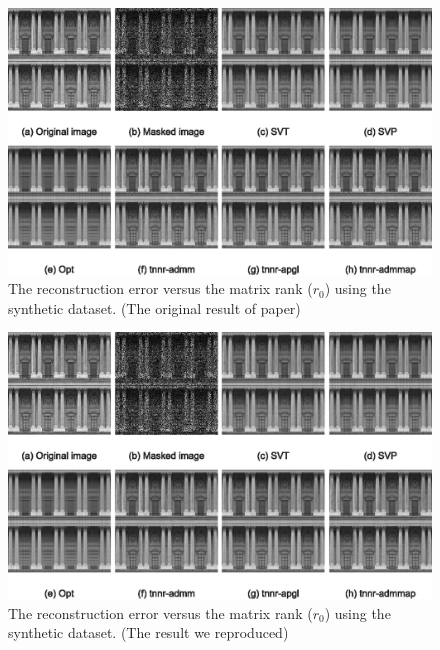 \documentclass{article}
\begin{document}
{\begin{figure}[ht]
	\centering
	\includegraphics[]{./assets/fig4.eps}
	\caption{The reconstruction error versus the matrix rank ($r_0$) using the synthetic dataset. (The original result of paper)}
	\label{fig4ori}
\end{figure}
\begin{figure}[ht]
	\centering
	\includegraphics[]{./assets/fig4.eps}
	\caption{The reconstruction error versus the matrix rank ($r_0$) using the synthetic dataset. (The result we reproduced)}
	\label{fig4}
\end{figure}

}
\end{document}
